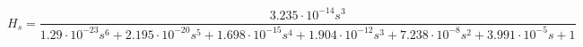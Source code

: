 \begin{equation}
H_{s} = \frac{3.235 \cdot 10^{-14} s^{3}}{1.29 \cdot 10^{-23} s^{6} + 2.195 \cdot 10^{-20} s^{5} + 1.698 \cdot 10^{-15} s^{4} + 1.904 \cdot 10^{-12} s^{3} + 7.238 \cdot 10^{-8} s^{2} + 3.991 \cdot 10^{-5} s + 1}
\end{equation}

